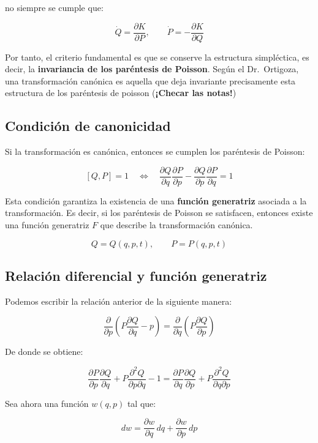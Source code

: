 \documentclass{article}
\begin{document}
no siempre se cumple que:

\[
\boxed{
\dot{Q} = \frac{\partial K}{\partial P}, 
\qquad
\dot{P} = -\frac{\partial K}{\partial Q}
}
\]

Por tanto, el criterio fundamental es que se conserve la estructura simpléctica, es decir, la \textbf{invariancia de los paréntesis de Poisson}.  
Según el Dr.~Ortigoza, una transformación canónica es aquella que deja invariante precisamente esta estructura de los paréntesis de poisson (\textcolor{Cinnabar}{\textbf{¡Checar las notas!}})


\subsection{Condición de canonicidad}

Si la transformación es canónica, entonces se cumplen los paréntesis de Poisson:

\[
[Q, P] = 1
\quad \Longleftrightarrow \quad
\frac{\partial Q}{\partial q}\frac{\partial P}{\partial p}
- 
\frac{\partial Q}{\partial p}\frac{\partial P}{\partial q} = 1
\]

Esta condición garantiza la existencia de una \textbf{función generatriz} asociada a la transformación.  
Es decir, si los paréntesis de Poisson se satisfacen, entonces existe una función generatriz $F$ que describe la transformación canónica.

\[
Q = Q(q,p,t),
\qquad
P = P(q,p,t)
\]


\subsection{Relación diferencial y función generatriz}

Podemos escribir la relación anterior de la siguiente manera:

\[
\frac{\partial}{\partial p}
\!\left(
P\frac{\partial Q}{\partial q} - p
\right)
=
\frac{\partial}{\partial q}
\!\left(
P\frac{\partial Q}{\partial p}
\right)
\]

De donde se obtiene:

\[
\frac{\partial P}{\partial p}\frac{\partial Q}{\partial q}
+ P\frac{\partial^{2} Q}{\partial p \partial q}
- 1
=
\frac{\partial P}{\partial q}\frac{\partial Q}{\partial p}
+ P\frac{\partial^{2} Q}{\partial q \partial p}
\]

Sea ahora una función \( w(q,p) \) tal que:

\[
dw = 
\boxed{
\frac{\partial w}{\partial q}\,dq
+ \frac{\partial w}{\partial p}\,dp
}
\]
\end{document}

